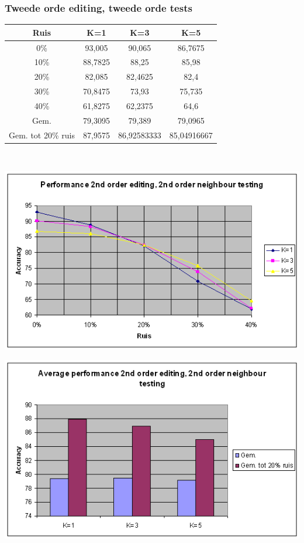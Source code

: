 \documentclass{article}
\begin{document}
\subsubsection{Tweede orde editing, tweede orde tests}

\begin{tabular}{|c|c|c|c|} \hline
Ruis &	K=1 &	K=3 &	K=5 \\ \hline
0\%	& 93,005 &	90,065 &	86,7675 \\
10\%	 & 88,7825 &	88,25 &	85,98 \\
20\%	 & 82,085 &	82,4625 &	82,4 \\
30\%	 & 70,8475 &	73,93 &	75,735 \\
40\%	 & 61,8275 &	62,2375 &	64,6 \\
Gem.	 & 79,3095 &	79,389 &	79,0965 \\
Gem. tot 20\% ruis &	87,9575 &	86,92583333 &	85,04916667 \\ \hline
\end{tabular} \\

\begin{center} \includegraphics[scale=0.7]{xor_2ndordedit_2ndordtest_lijn} \end{center}
\begin{center} \includegraphics[scale=0.7]{xor_2ndordedit_2ndordtest_staaf} \end{center}
\end{document}
